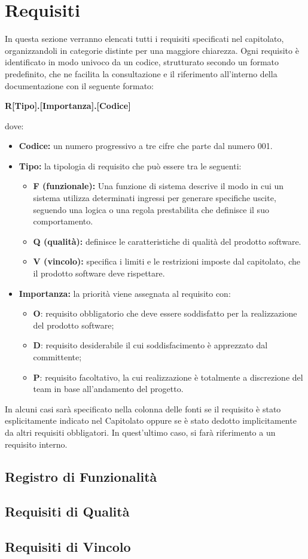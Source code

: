 \section{Requisiti}
In questa sezione verranno elencati tutti i requisiti specificati nel capitolato, organizzandoli in categorie distinte per una maggiore chiarezza. Ogni requisito è identificato in modo univoco da un codice, strutturato secondo un formato predefinito, che ne facilita la consultazione e il riferimento all'interno della documentazione con il seguente formato: 
\begin{center}
\textbf{R[Tipo].[Importanza].[Codice]}
\end{center}
dove:
\begin{itemize}
    \item \textbf{Codice:} un numero progressivo a tre cifre che parte dal numero 001.
    \item \textbf{Tipo:} la tipologia di requisito che può essere tra le seguenti:
    \begin{itemize}[label=-]
        \item \textbf{F (funzionale):} Una funzione di sistema descrive il modo in cui un sistema utilizza determinati ingressi per generare specifiche uscite, seguendo una logica o una regola prestabilita che definisce il suo comportamento.
        \item \textbf{Q (qualità):} definisce le caratteristiche di qualità del prodotto software.
        \item \textbf{V (vincolo):} specifica i limiti e le restrizioni imposte dal capitolato, che il prodotto software deve rispettare.
\end{itemize}
    \item \textbf{Importanza:} la priorità viene assegnata al requisito con:
    \begin{itemize}
     \item \textbf{O}: requisito obbligatorio che deve essere soddisfatto per la realizzazione del prodotto software;
        \item \textbf{D}: requisito desiderabile il cui soddisfacimento è apprezzato dal committente;
        \item \textbf{P}: requisito facoltativo, la cui realizzazione è totalmente a discrezione del team in base all'andamento del progetto.
    \end{itemize}
\end{itemize}
In alcuni casi sarà specificato nella colonna delle fonti se il requisito è stato esplicitamente indicato nel Capitolato oppure se è stato dedotto implicitamente da altri requisiti obbligatori. In quest’ultimo caso, si farà riferimento a un requisito interno.
\subsection{Registro di Funzionalità}

\subsection{Requisiti di Qualità}

\subsection{Requisiti di Vincolo}
